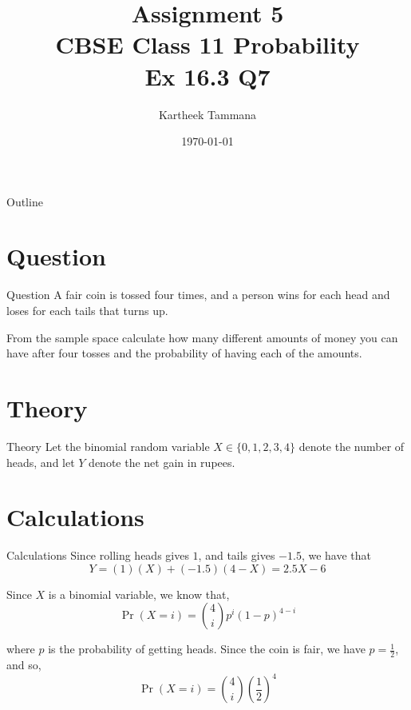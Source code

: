\documentclass{beamer}
\title{Assignment 5 \\ CBSE Class 11 Probability \\ Ex 16.3 Q7}
\author{Kartheek Tammana}
\date{\today}
\providecommand{\pr}[1]{\ensuremath{\Pr\left(#1\right)}}
\begin{document}
\begin{frame}
    \titlepage
\end{frame}

\logo{}

\begin{frame}{Outline}
    \tableofcontents
\end{frame}

\section{Question}
\begin{frame}{Question}
A fair coin is tossed four times, and a person wins  for each head and loses  for
each tails that turns up.

From the sample space calculate how many different amounts of money you can have after four tosses
and the probability of having each of the amounts.
\end{frame}

\section{Theory}
\begin{frame}{Theory}
    Let the binomial random variable $X \in \{0, 1, 2, 3, 4\}$ denote the number of heads, and let
    $Y$ denote the net gain in rupees.
\end{frame}

\section{Calculations}
\begin{frame}{Calculations}
    Since rolling heads gives \rupee $1$, and tails gives \rupee $-1.5$, we have that
    \begin{equation}
        Y = (1)(X) + (-1.5)(4 - X) = 2.5 X - 6
    \end{equation}

    Since $X$ is a binomial variable, we know that,
    \begin{equation}
        \pr{X=i} = \binom{4}{i} p^{i} (1-p)^{4-i}
    \end{equation}

    where $p$ is the probability of getting heads. Since the coin is fair, we have
    $p = \frac{1}{2}$, and so,
    \begin{equation}
        \pr{X=i} = \binom{4}{i} {\left(\frac{1}{2}\right)}^{4}
    \end{equation}

\end{frame}
\end{document}
